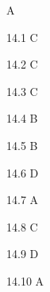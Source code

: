 \begin{Solution}{14}
A
\end{Solution}
\begin{Solution}{14.{1}}
C
\end{Solution}
\begin{Solution}{14.{2}}
C
\end{Solution}
\begin{Solution}{14.{3}}
C
\end{Solution}
\begin{Solution}{14.{4}}
B
\end{Solution}
\begin{Solution}{14.{5}}
B
\end{Solution}
\begin{Solution}{14.{6}}
D
\end{Solution}
\begin{Solution}{14.{7}}
A
\end{Solution}
\begin{Solution}{14.{8}}
C
\end{Solution}
\begin{Solution}{14.{9}}
D
\end{Solution}
\begin{Solution}{14.{10}}
A
\end{Solution}
